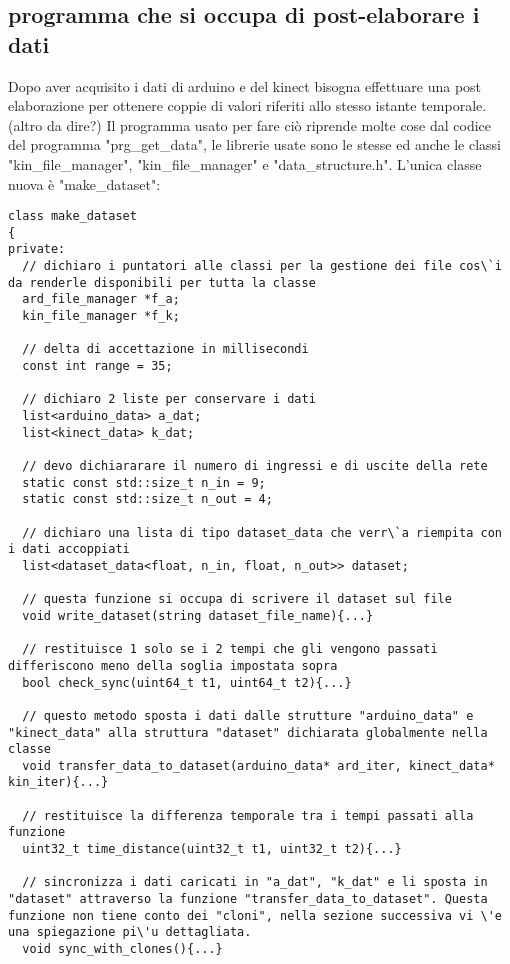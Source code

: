 \documentclass[10pt,a4paper]{article}
\begin{document}
\subsection{programma che si occupa di post-elaborare i dati}
Dopo aver acquisito i dati di arduino e del kinect bisogna effettuare una post elaborazione per ottenere coppie di valori riferiti allo stesso istante temporale. 
(altro da dire?)
Il programma usato per fare ci\`o riprende molte cose dal codice del programma "prg\_get\_data", le librerie usate sono le stesse ed anche le classi "kin\_file\_manager", "kin\_file\_manager" e "data\_structure.h".
L'unica classe nuova \`e "make\_dataset":
\begin{lstlisting}[style=mycpp, caption=librerie usate, captionpos=b]
class make_dataset
{
private:
  // dichiaro i puntatori alle classi per la gestione dei file cos\`i da renderle disponibili per tutta la classe
  ard_file_manager *f_a;
  kin_file_manager *f_k;

  // delta di accettazione in millisecondi
  const int range = 35; 

  // dichiaro 2 liste per conservare i dati 
  list<arduino_data> a_dat;
  list<kinect_data> k_dat;

  // devo dichiararare il numero di ingressi e di uscite della rete
  static const std::size_t n_in = 9;
  static const std::size_t n_out = 4;

  // dichiaro una lista di tipo dataset_data che verr\`a riempita con i dati accoppiati
  list<dataset_data<float, n_in, float, n_out>> dataset;

  // questa funzione si occupa di scrivere il dataset sul file
  void write_dataset(string dataset_file_name){...}

  // restituisce 1 solo se i 2 tempi che gli vengono passati differiscono meno della soglia impostata sopra
  bool check_sync(uint64_t t1, uint64_t t2){...}

  // questo metodo sposta i dati dalle strutture "arduino_data" e "kinect_data" alla struttura "dataset" dichiarata globalmente nella classe
  void transfer_data_to_dataset(arduino_data* ard_iter, kinect_data* kin_iter){...}

  // restituisce la differenza temporale tra i tempi passati alla funzione
  uint32_t time_distance(uint32_t t1, uint32_t t2){...}

  // sincronizza i dati caricati in "a_dat", "k_dat" e li sposta in "dataset" attraverso la funzione "transfer_data_to_dataset". Questa funzione non tiene conto dei "cloni", nella sezione successiva vi \'e una spiegazione pi\'u dettagliata. 
  void sync_with_clones(){...}


\end{lstlisting}
\end{document}
